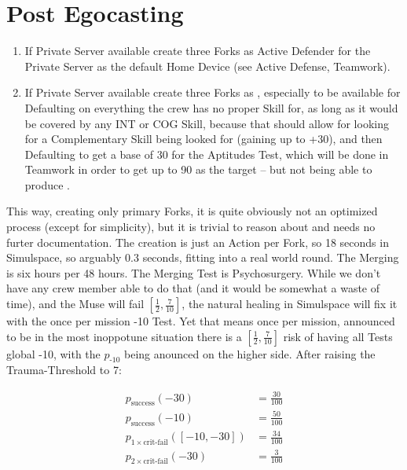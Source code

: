 \section{Post Egocasting}

\begin{enumerate}
    \item If \gls{Private Server} available create three \glspl{Fork} as \gls{Active Defender} for the \gls{Private Server} as the default \gls{Home Device} (see \gls{Active Defense}, \gls{Teamwork}).
    \item If \gls{Private Server} available create three \glspl{Fork} as , especially to be available for \gls{Defaulting} on everything the crew has no proper Skill for, as long as it would be covered by any INT or COG Skill, because that should allow for looking for a \gls{Complementary Skill} being looked for (gaining up to +30), and then \gls{Defaulting} to get a base of 30 for the Aptitudes Test, which will be done in \gls{Teamwork} in order to get up to 90 as the target -- but not being able to produce .
\end{enumerate}

This way, creating only primary \glspl{Fork}, it is quite obviously not an optimized process (except for simplicity), but it is trivial to reason about and needs no furter documentation. The creation is just an Action per \gls{Fork}, so 18 seconds in Simulspace, so arguably 0.3 seconds, fitting into a real world round. The Merging is six hours per 48 hours. The Merging Test is Psychosurgery. While we don't have any crew member able to do that (and it would be somewhat a waste of time), and the Muse will fail $\left[\frac{1}{2}, \frac{7}{10}\right]$, the natural healing in Simulspace will fix it with the once per mission -10 Test. Yet that means once per mission, announced to be in the most inoppotune situation there is a $\left[\frac{1}{2}, \frac{7}{10}\right]$ risk of having all Tests global -10, with the $p_{\text{-10}}$ being anounced on the higher side. After raising the Trauma-Threshold to 7:

\begin{align}
    p_{\text{success}}(-30) &= \frac{30}{100} \\
    p_{\text{success}}(-10) &= \frac{50}{100} \\
    p_{1 \times \text{crit-fail}}(\left[-10,-30\right]) &= \frac{34}{100} \\
    p_{2 \times \text{crit-fail}}(-30) &= \frac{3}{100}
\end{align}

